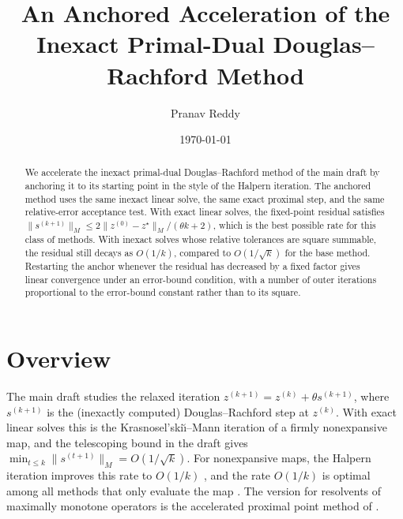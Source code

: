 


\usepackage{xcolor}
\newcommand{\mynote}[1]{\textcolor{blue}{[#1]}}

\title{An Anchored Acceleration of the Inexact Primal-Dual Douglas--Rachford Method}
\author{Pranav Reddy}
\date{\small \today \vspace{-5mm}}



\maketitle

\begin{abstract}
    We accelerate the inexact primal-dual Douglas--Rachford method of the main draft by anchoring it to its starting point in the style of the Halpern iteration.
    The anchored method uses the same inexact linear solve, the same exact proximal step, and the same relative-error acceptance test.
    With exact linear solves, the fixed-point residual satisfies $\|s^{(k+1)}\|_M \le 2\|z^{(0)} - z^\star\|_M/(\theta k + 2)$, which is the best possible rate for this class of methods.
    With inexact solves whose relative tolerances are square summable, the residual still decays as $O(1/k)$, compared to $O(1/\sqrt{k})$ for the base method.
    Restarting the anchor whenever the residual has decreased by a fixed factor gives linear convergence under an error-bound condition, with a number of outer iterations proportional to the error-bound constant rather than to its square.
\end{abstract}

\section{Overview}\label{sec:acc-overview}
The main draft studies the relaxed iteration $z^{(k+1)} = z^{(k)} + \theta s^{(k+1)}$, where $s^{(k+1)}$ is the (inexactly computed) Douglas--Rachford step at $z^{(k)}$.
With exact linear solves this is the Krasnosel'ski\u{\i}--Mann iteration of a firmly nonexpansive map, and the telescoping bound in the draft gives $\min_{t \le k}\|s^{(t+1)}\|_M = O(1/\sqrt{k})$.
For nonexpansive maps, the Halpern iteration \citep{halpern1967} improves this rate to $O(1/k)$ \citep{sabach2017first, lieder2021halpern, diakonikolas2020halpern}, and the rate $O(1/k)$ is optimal among all methods that only evaluate the map \citep{park2022exact}.
The version for resolvents of maximally monotone operators is the accelerated proximal point method of \citet{kim2021accelerated}.

